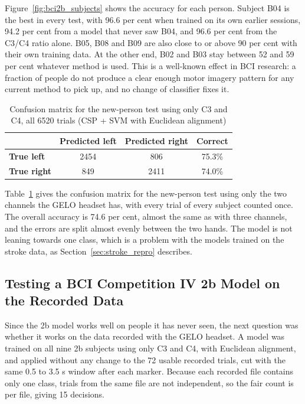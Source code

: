 Figure~\ref{fig:bci2b_subjects} shows the accuracy for each person. Subject B04 is the
best in every test, with 96.6 per cent when trained on its own earlier sessions, 94.2 per
cent from a model that never saw B04, and 96.6 per cent from the C3/C4 ratio alone. B05,
B08 and B09 are also close to or above 90 per cent with their own training data. At the
other end, B02 and B03 stay between 52 and 59 per cent whatever method is used. This is a
well-known effect in BCI research: a fraction of people do not produce a clear enough
motor imagery pattern for any current method to pick up, and no change of classifier
fixes it.

\begin{table}[!htbp]
\centering
\caption{Confusion matrix for the new-person test using only C3 and C4, all 6520 trials (CSP + SVM with Euclidean alignment)}
\label{tab:bci2b_confusion}
\begin{tabular}{|l|c|c|c|}
\hline
 & \textbf{Predicted left} & \textbf{Predicted right} & \textbf{Correct} \\
\hline
\textbf{True left}  & 2454 & 806  & 75.3\% \\
\hline
\textbf{True right} & 849  & 2411 & 74.0\% \\
\hline
\end{tabular}
\end{table}

Table~\ref{tab:bci2b_confusion} gives the confusion matrix for the new-person test using
only the two channels the GELO headset has, with every trial of every subject counted
once. The overall accuracy is 74.6 per cent, almost the same as with three channels, and
the errors are split almost evenly between the two hands. The model is not leaning
towards one class, which is a problem with the models trained on the stroke data, as
Section~\ref{sec:stroke_repro} describes.

\FloatBarrier

\subsection{Testing a BCI Competition IV 2b Model on the Recorded Data}
\label{sec:bci2b_recorded}

Since the 2b model works well on people it has never seen, the next question was whether
it works on the data recorded with the GELO headset. A model was trained on all nine 2b
subjects using only C3 and C4, with Euclidean alignment, and applied without any change
to the 72 usable recorded trials, cut with the same 0.5 to 3.5 s window after each marker.
Because each recorded file contains only one class, trials from the same file are not
independent, so the fair count is per file, giving 15 decisions.

